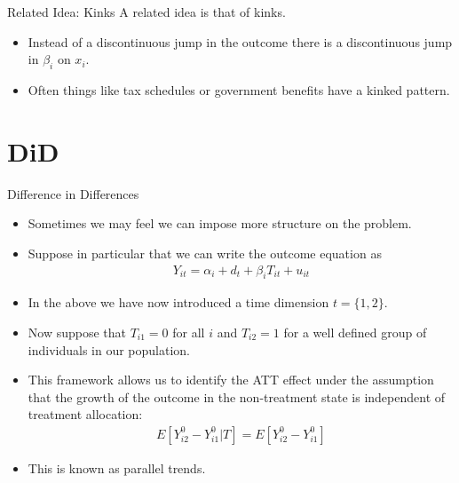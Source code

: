 \begin{frame}{Related Idea: Kinks}
 A related idea is that of \alert{kinks}. 
\begin{itemize}
\item Instead of a discontinuous jump in the outcome there is a discontinuous jump in $\beta_i$ on $x_i$.
\item Often things like tax schedules or government benefits have a kinked pattern.
\end{itemize}
\end{frame}

\section{DiD}
\begin{frame}{Difference in Differences }
\begin{itemize}
\item Sometimes we may feel we can impose more structure on the problem.
\item Suppose in particular that we can write the outcome equation as
\begin{align*}
 Y_{it} =\alpha_i +d_t +\beta_i T_{it} +u_{it}
 \end{align*}
\item In the above we have now introduced a time dimension $t=\{1,2\}$. 
\item Now suppose that $T_{i1}=0$ for all $i$ and $T_{i2}=1$ for a well defined group of individuals in our population.
\item This framework allows us to identify the ATT effect under the assumption that the growth of the outcome in the non-treatment state is independent of treatment allocation:
\begin{align*}
E[Y_{i2}^0 - Y_{i1}^0 | T] = E[Y_{i2}^0 - Y_{i1}^0] 
\end{align*}
\item This is known as \alert{parallel trends}.
\end{itemize}
\end{frame}

